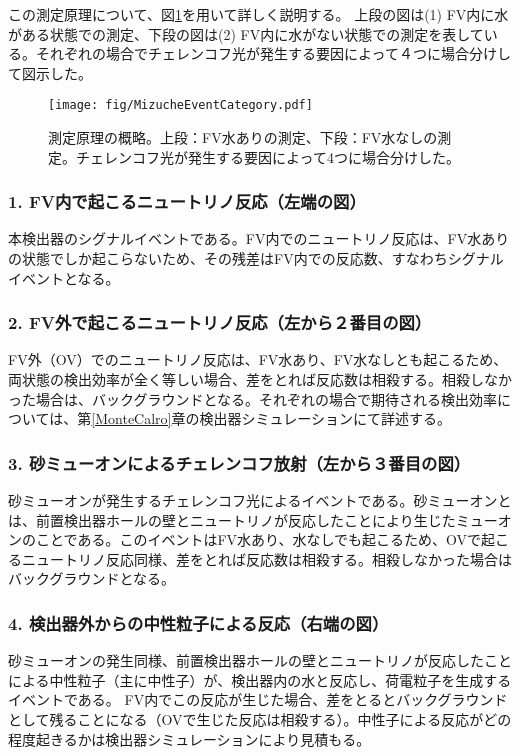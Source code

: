 \documentclass[11pt]{ltjsreport}
\newcommand{\figref}[1]{図\ref{#1}}
\newcommand{\secref}[1]{第\ref{#1}章}
\begin{document}
この測定原理について、\figref{EventCategory}を用いて詳しく説明する。
上段の図は(1) FV内に水がある状態での測定、下段の図は(2) FV内に水がない状態での測定を表している。それぞれの場合でチェレンコフ光が発生する要因によって４つに場合分けして図示した。

\begin{figure}[htbp]
\centering
\texttt{[image: fig/MizucheEventCategory.pdf]}
\caption[測定原理の概略]{測定原理の概略。上段：FV水ありの測定、下段：FV水なしの測定。チェレンコフ光が発生する要因によって4つに場合分けした。}
\label{EventCategory}
\end{figure}

\subsubsection{1. FV内で起こるニュートリノ反応（左端の図）}
本検出器のシグナルイベントである。FV内でのニュートリノ反応は、FV水ありの状態でしか起こらないため、その残差はFV内での反応数、すなわちシグナルイベントとなる。


\subsubsection{2. FV外で起こるニュートリノ反応（左から２番目の図）}
FV外（OV）でのニュートリノ反応は、FV水あり、FV水なしとも起こるため、両状態の検出効率が全く等しい場合、差をとれば反応数は相殺する。相殺しなかった場合は、バックグラウンドとなる。それぞれの場合で期待される検出効率については、\secref{MonteCalro}の検出器シミュレーションにて詳述する。

\subsubsection{3. 砂ミューオンによるチェレンコフ放射（左から３番目の図）}
砂ミューオンが発生するチェレンコフ光によるイベントである。砂ミューオンとは、前置検出器ホールの壁とニュートリノが反応したことにより生じたミューオンのことである。このイベントはFV水あり、水なしでも起こるため、OVで起こるニュートリノ反応同様、差をとれば反応数は相殺する。相殺しなかった場合はバックグラウンドとなる。

\subsubsection{4. 検出器外からの中性粒子による反応（右端の図）}
砂ミューオンの発生同様、前置検出器ホールの壁とニュートリノが反応したことによる中性粒子（主に中性子）が、検出器内の水と反応し、荷電粒子を生成するイベントである。
FV内でこの反応が生じた場合、差をとるとバックグラウンドとして残ることになる（OVで生じた反応は相殺する）。中性子による反応がどの程度起きるかは検出器シミュレーションにより見積もる。
\end{document}
